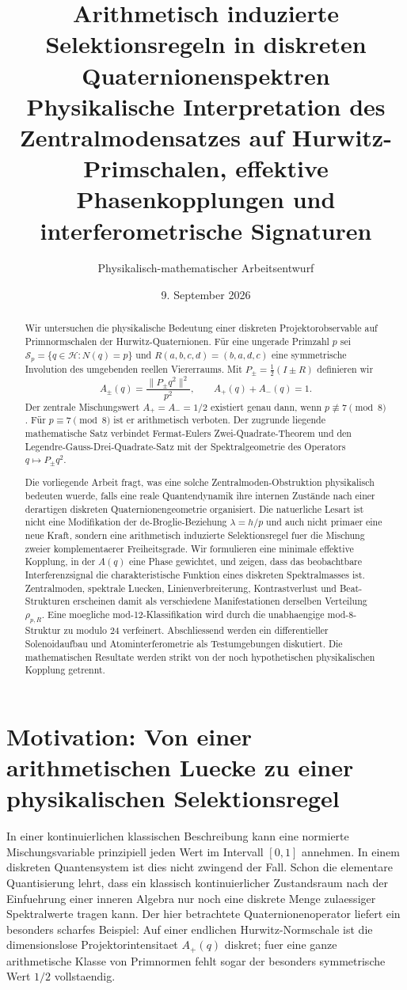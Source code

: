 \documentclass[11pt,a4paper]{article}
\title{\textbf{Arithmetisch induzierte Selektionsregeln in diskreten Quaternionenspektren}\\[2mm]
\large Physikalische Interpretation des Zentralmodensatzes auf Hurwitz-Primschalen, effektive Phasenkopplungen und interferometrische Signaturen}
\author{Physikalisch-mathematischer Arbeitsentwurf}
\date{9. September 2026}
\theoremstyle{definition}
\begin{document}
\maketitle

\begin{abstract}
Wir untersuchen die physikalische Bedeutung einer diskreten Projektorobservable auf Primnormschalen der Hurwitz-Quaternionen. Für eine ungerade Primzahl $p$ sei $\mathcal S_p=\{q\in\mathcal H:N(q)=p\}$ und $R(a,b,c,d)=(b,a,d,c)$ eine symmetrische Involution des umgebenden reellen Viererraums. Mit $P_\pm=\frac12(I\pm R)$ definieren wir
\[
A_\pm(q)=\frac{\|P_\pm q^2\|^2}{p^2},\qquad A_+(q)+A_-(q)=1.
\]
Der zentrale Mischungswert $A_+=A_-=1/2$ existiert genau dann, wenn $p\not\equiv7\pmod8$. Für $p\equiv7\pmod8$ ist er arithmetisch verboten. Der zugrunde liegende mathematische Satz verbindet Fermat-Eulers Zwei-Quadrate-Theorem und den Legendre-Gauss-Drei-Quadrate-Satz mit der Spektralgeometrie des Operators $q\mapsto P_\pm q^2$.

Die vorliegende Arbeit fragt, was eine solche Zentralmoden-Obstruktion physikalisch bedeuten wuerde, falls eine reale Quantendynamik ihre internen Zustände nach einer derartigen diskreten Quaternionengeometrie organisiert. Die natuerliche Lesart ist nicht eine Modifikation der de-Broglie-Beziehung $\lambda=h/p$ und auch nicht primaer eine neue Kraft, sondern eine arithmetisch induzierte Selektionsregel fuer die Mischung zweier komplementaerer Freiheitsgrade. Wir formulieren eine minimale effektive Kopplung, in der $A(q)$ eine Phase gewichtet, und zeigen, dass das beobachtbare Interferenzsignal die charakteristische Funktion eines diskreten Spektralmasses ist. Zentralmoden, spektrale Luecken, Linienverbreiterung, Kontrastverlust und Beat-Strukturen erscheinen damit als verschiedene Manifestationen derselben Verteilung $\rho_{p,R}$. Eine moegliche mod-12-Klassifikation wird durch die unabhaengige mod-8-Struktur zu modulo $24$ verfeinert. Abschliessend werden ein differentieller Solenoidaufbau und Atominterferometrie als Testumgebungen diskutiert. Die mathematischen Resultate werden strikt von der noch hypothetischen physikalischen Kopplung getrennt.
\end{abstract}

\tableofcontents
\newpage

\section{Motivation: Von einer arithmetischen Luecke zu einer physikalischen Selektionsregel}
In einer kontinuierlichen klassischen Beschreibung kann eine normierte Mischungsvariable prinzipiell jeden Wert im Intervall $[0,1]$ annehmen. In einem diskreten Quantensystem ist dies nicht zwingend der Fall. Schon die elementare Quantisierung lehrt, dass ein klassisch kontinuierlicher Zustandsraum nach der Einfuehrung einer inneren Algebra nur noch eine diskrete Menge zulaessiger Spektralwerte tragen kann. Der hier betrachtete Quaternionenoperator liefert ein besonders scharfes Beispiel: Auf einer endlichen Hurwitz-Normschale ist die dimensionslose Projektorintensitaet $A_+(q)$ diskret; fuer eine ganze arithmetische Klasse von Primnormen fehlt sogar der besonders symmetrische Wert $1/2$ vollstaendig.
\end{document}
